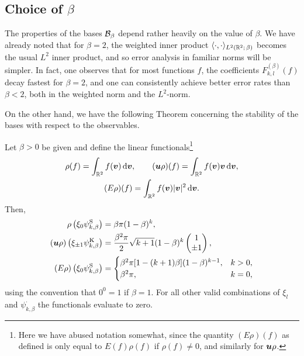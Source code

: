 \subsection{Choice of $\beta$}

The properties of the bases $\mathcal{B}_\beta$ depend rather heavily on the value of $\beta$. We have already noted
that for $\beta=2$, the weighted inner product $\langle\cdot,\cdot\rangle_{L^2(\mathbb{R}^2;\,\beta)}$ becomes the
usual $L^2$ inner product, and so error analysis in familiar norms will be simpler. In fact, one observes
that for most functions $f$, the coefficients $F_{k,l}^{(\beta)}(f)$ decay fastest for $\beta=2$, and one can
consistently achieve better error rates than $\beta<2$, both in the weighted norm and the $L^2$-norm.

On the other hand, we have the following Theorem concerning the stability of the bases with respect to the
observables.
\begin{theorem} \label{thm:polobs}
Let $\beta>0$ be given and define the linear functionals\footnote{Here we have abused notation somewhat, since
the quantity $(E\rho)(f)$ as defined is only equal to $E(f)\rho(f)$ if $\rho(f)\neq0$, and similarly for
${\bm u}\rho$.}
\begin{gather*}
    \rho(f) = \int_{\mathbb{R}^2} f({\bm v}) \,\mathrm{d}{\bm v}, \qquad
    ({\bm u} \rho)(f) = \int_{\mathbb{R}^2} f({\bm v}) {\bm v} \,\mathrm{d}{\bm v},\\
    (E \rho)(f) = \int_{\mathbb{R}^2} f({\bm v}) |{\bm v}|^2 \,\mathrm{d}{\bm v}.
\end{gather*}
Then,
\begin{align*}
    \rho\left(\xi_0\psi^{\mathrm{S}}_{k,\beta}\right) &= \beta\pi(1-\beta)^k, \\
    ({\bm u}\rho)\left(\xi_{\pm 1}\psi^{\mathrm{K}}_{k,\beta}\right) &= \frac{\beta^2\pi}{2}\sqrt{k+1}(1-\beta)^k
    \begin{pmatrix}1\\\pm1\end{pmatrix}, \\
    (E\rho)\left(\xi_0\psi^{\mathrm{S}}_{k,\beta}\right) &= 
        \begin{cases}
            \beta^2\pi[1-(k+1)\beta](1-\beta)^{k-1}, & k>0, \\
            \beta^2\pi, & k=0,
        \end{cases}
\end{align*}
using the convention that $0^0=1$ if $\beta=1$. For all other valid combinations of $\xi_l$ and
$\psi^\cdot_{k,\beta}$ the functionals evaluate to zero.
\end{theorem}
